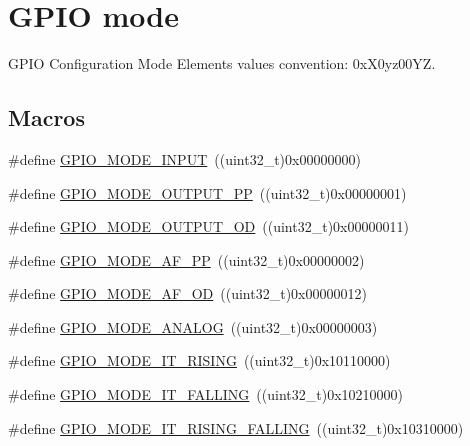 \hypertarget{group___g_p_i_o__mode}{\section{G\-P\-I\-O mode}
\label{group___g_p_i_o__mode}
}


G\-P\-I\-O Configuration Mode Elements values convention\-: 0x\-X0yz00\-Y\-Z.  


\subsection*{Macros}
\begin{DoxyCompactItemize}
\item 
\#define \hyperlink{group___g_p_i_o__mode_gaf40bec3146810028a84b628d37d3b391}{G\-P\-I\-O\-\_\-\-M\-O\-D\-E\-\_\-\-I\-N\-P\-U\-T}~((uint32\-\_\-t)0x00000000)
\item 
\#define \hyperlink{group___g_p_i_o__mode_ga1013838a64cec2f8c88f079c449d1982}{G\-P\-I\-O\-\_\-\-M\-O\-D\-E\-\_\-\-O\-U\-T\-P\-U\-T\-\_\-\-P\-P}~((uint32\-\_\-t)0x00000001)
\item 
\#define \hyperlink{group___g_p_i_o__mode_ga2f91757829f6e9505ec386b840941929}{G\-P\-I\-O\-\_\-\-M\-O\-D\-E\-\_\-\-O\-U\-T\-P\-U\-T\-\_\-\-O\-D}~((uint32\-\_\-t)0x00000011)
\item 
\#define \hyperlink{group___g_p_i_o__mode_ga526c72c5264316fc05c775b6cad4aa6a}{G\-P\-I\-O\-\_\-\-M\-O\-D\-E\-\_\-\-A\-F\-\_\-\-P\-P}~((uint32\-\_\-t)0x00000002)
\item 
\#define \hyperlink{group___g_p_i_o__mode_ga282b9fd37c8ef31daba314ffae6bf023}{G\-P\-I\-O\-\_\-\-M\-O\-D\-E\-\_\-\-A\-F\-\_\-\-O\-D}~((uint32\-\_\-t)0x00000012)
\item 
\#define \hyperlink{group___g_p_i_o__mode_ga7a04f9ab65ad572ad20791a35009220c}{G\-P\-I\-O\-\_\-\-M\-O\-D\-E\-\_\-\-A\-N\-A\-L\-O\-G}~((uint32\-\_\-t)0x00000003)
\item 
\#define \hyperlink{group___g_p_i_o__mode_ga088659562e68426d9a72821ea4fd8d50}{G\-P\-I\-O\-\_\-\-M\-O\-D\-E\-\_\-\-I\-T\-\_\-\-R\-I\-S\-I\-N\-G}~((uint32\-\_\-t)0x10110000)
\item 
\#define \hyperlink{group___g_p_i_o__mode_gaa166210a6da3ac7e8d7504702520e522}{G\-P\-I\-O\-\_\-\-M\-O\-D\-E\-\_\-\-I\-T\-\_\-\-F\-A\-L\-L\-I\-N\-G}~((uint32\-\_\-t)0x10210000)
\item 
\#define \hyperlink{group___g_p_i_o__mode_ga0678e61090ed61e91a6496f22ddfb3d1}{G\-P\-I\-O\-\_\-\-M\-O\-D\-E\-\_\-\-I\-T\-\_\-\-R\-I\-S\-I\-N\-G\-\_\-\-F\-A\-L\-L\-I\-N\-G}~((uint32\-\_\-t)0x10310000)

\end{DoxyCompactItemize}
